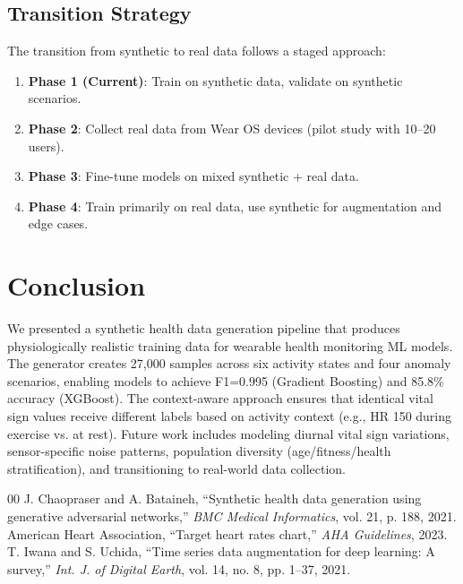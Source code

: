 \documentclass[conference]{IEEEtran}
\begin{document}
\subsection{Transition Strategy}
The transition from synthetic to real data follows a staged approach:
\begin{enumerate}
    \item \textbf{Phase 1 (Current)}: Train on synthetic data, validate on synthetic scenarios.
    \item \textbf{Phase 2}: Collect real data from Wear OS devices (pilot study with 10--20 users).
    \item \textbf{Phase 3}: Fine-tune models on mixed synthetic + real data.
    \item \textbf{Phase 4}: Train primarily on real data, use synthetic for augmentation and edge cases.
\end{enumerate}

\section{Conclusion}
We presented a synthetic health data generation pipeline that produces physiologically realistic training data for wearable health monitoring ML models. The generator creates 27,000 samples across six activity states and four anomaly scenarios, enabling models to achieve F1=0.995 (Gradient Boosting) and 85.8\% accuracy (XGBoost). The context-aware approach ensures that identical vital sign values receive different labels based on activity context (e.g., HR 150 during exercise vs. at rest). Future work includes modeling diurnal vital sign variations, sensor-specific noise patterns, population diversity (age/fitness/health stratification), and transitioning to real-world data collection.

\begin{thebibliography}{00}
 J. Chaopraser and A. Bataineh, ``Synthetic health data generation using generative adversarial networks,'' \textit{BMC Medical Informatics}, vol. 21, p. 188, 2021.
 American Heart Association, ``Target heart rates chart,'' \textit{AHA Guidelines}, 2023.
 T. Iwana and S. Uchida, ``Time series data augmentation for deep learning: A survey,'' \textit{Int. J. of Digital Earth}, vol. 14, no. 8, pp. 1--37, 2021.
\end{thebibliography}
\end{document}
